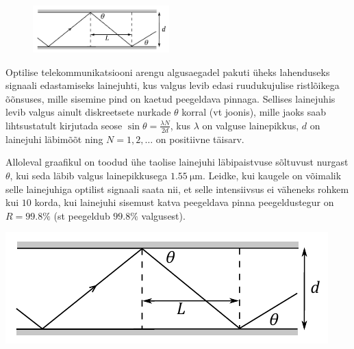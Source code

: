
\begin{figure}
  \begin{center}
		\vspace{-15pt}
		\includegraphics[width=0.47\textwidth]{2021-v2g-08-yl.pdf}
		\vspace{-35pt}
  \end{center}
\end{figure}
Optilise telekommunikatsiooni arengu algusaegadel pakuti üheks lahenduseks signaali edastamiseks lainejuhti, kus valgus levib edasi ruudukujulise ristlõikega õõnsuses, mille sisemine pind on kaetud peegeldava pinnaga. Sellises lainejuhis levib valgus ainult diskreetsete nurkade $\theta$ korral (vt joonis), mille jaoks saab lihtsustatult kirjutada seose $\sin\theta=\tfrac{\lambda N}{2d}$, kus $\lambda$ on valguse lainepikkus, $d$ on lainejuhi läbimõõt ning $N=1,2,\dots$ on positiivne täisarv.

Alloleval graafikul on toodud ühe taolise lainejuhi läbipaistvuse sõltuvust nurgast $\theta$, kui seda läbib valgus lainepikkusega $\SI{1.55}{\micro\m}$. Leidke, kui kaugele on võimalik selle lainejuhiga optilist signaali saata nii, et selle intensiivsus ei väheneks rohkem kui $10$ korda, kui lainejuhi sisemust katva peegeldava pinna peegeldustegur on $R=99.8\%$ (st peegeldub $99.8\%$ valgusest).

\begin{figure}[H]
	\centering
	
	\vspace{-45pt}
\end{figure}


\hint

\solu
\begin{center}
\includegraphics[]{2021-v2g-08-yl.pdf}
\end{center}

